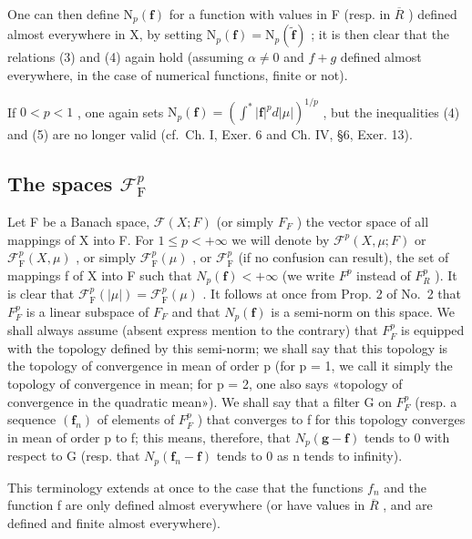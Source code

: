 One can then define \(\mathrm{N}_{p}(\mathbf{f})\) for a function with values in F (resp. in \(\overline{R}\) ) defined almost everywhere in X, by setting \(\mathrm{N}_{p}(\mathbf{f})=\mathrm{N}_{p}(\widetilde{\mathbf{f}})\) ; it is then clear that the relations (3) and (4) again hold (assuming \(\alpha\neq0\) and \(f+g\) defined almost everywhere, in the case of numerical functions, finite or not).

If \(0 < p < 1\) , one again sets \(\mathrm{N}_p(\mathbf{f}) = (\int^* |\mathbf{f}|^p d|\mu|)^{1/p}\) , but the inequalities (4) and (5) are no longer valid (cf.~Ch. I, Exer. 6 and Ch. IV, §6, Exer. 13).

\subsection{\texorpdfstring{The spaces \(\mathcal{F}_{\mathrm{F}}^{p}\)}{The spaces F sub F to the p}}

Let F be a Banach space, \(\mathcal{F}(X;F)\) (or simply \(F_{F}\) ) the vector space of all mappings of X into F. For \(1 \leqslant p < +\infty\) we will denote by \(\mathcal{F}^{p}(X,\mu;F)\) or \(\mathcal{F}_{\mathrm{F}}^{p}(X,\mu)\) , or simply \(\mathcal{F}_{\mathrm{F}}^{p}(\mu)\) , or \(\mathcal{F}_{\mathrm{F}}^{p}\) (if no confusion can result), the set of mappings f of X into F such that \(N_{p}(\mathbf{f}) < +\infty\) (we write \(F^{p}\) instead of \(F_{R}^{p}\) ). It is clear that \(\mathcal{F}_{\mathrm{F}}^{p}(|\mu|) = \mathcal{F}_{\mathrm{F}}^{p}(\mu)\) . It follows at once from Prop. 2 of No.~2 that \(F_{F}^{p}\) is a linear subspace of \(F_{F}\) and that \(N_{p}(\mathbf{f})\) is a semi-norm on this space. We shall always assume (absent express mention to the contrary) that \(F_{F}^{p}\) is equipped with the topology defined by this semi-norm; we shall say that this topology is the topology of convergence in mean of order p (for p = 1, we call it simply the topology of convergence in mean; for p = 2, one also says «topology of convergence in the quadratic mean»). We shall say that a filter G on \(F_{F}^{p}\) (resp. a sequence \((\mathbf{f}_{n})\) of elements of \(F_{F}^{p}\) ) that converges to f for this topology converges in mean of order p to f; this means, therefore, that \(N_{p}(\mathbf{g}-\mathbf{f})\) tends to 0 with respect to G (resp. that \(N_{p}(\mathbf{f}_{n}-\mathbf{f})\) tends to 0 as n tends to infinity).

This terminology extends at once to the case that the functions \(f_{n}\) and the function f are only defined almost everywhere (or have values in \(\overline{R}\) , and are defined and finite almost everywhere).

